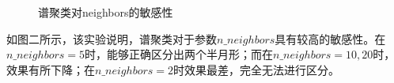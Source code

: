 \documentclass[11pt]{scrartcl}
\begin{document}
\begin{figure}[htbp]
{}
\quad
{}
\quad
{}
\caption{谱聚类对neighbors的敏感性}
\end{figure}
如图二所示，该实验说明，谱聚类对于参数$n\_neighbors$具有较高的敏感性。在$n\_neighbors=5$时，能够正确区分出两个半月形；而在$n\_neighbors=10,20$时，效果有所下降；在$n\_neighbors=2$时效果最差，完全无法进行区分。
\end{document}
